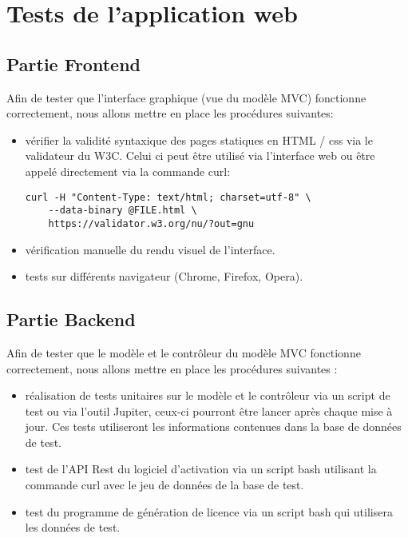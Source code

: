 \section{Tests de l'application web}

\subsection{Partie Frontend}

Afin de tester que l'interface graphique (vue du modèle MVC) fonctionne correctement, nous allons mettre en place les procédures suivantes:
\begin{itemize}

    \item vérifier la validité syntaxique des pages statiques en HTML / css via 
          le validateur du W3C. Celui ci peut être utilisé via l'interface web ou  
          être appelé directement via la commande curl:
          \begin{verbatim}
curl -H "Content-Type: text/html; charset=utf-8" \
    --data-binary @FILE.html \
    https://validator.w3.org/nu/?out=gnu
          \end{verbatim}
              
    \item vérification manuelle du rendu visuel de l'interface.
    \item tests sur différents navigateur (Chrome, Firefox, Opera).
            
\end{itemize}
\newpage

\subsection{Partie Backend}

Afin de tester que le modèle et le contrôleur du modèle MVC fonctionne correctement, 
nous allons mettre en place les procédures suivantes :
\begin{itemize}
    \item réalisation de tests unitaires sur le modèle et le contrôleur via 
          un script de test ou via l'outil Jupiter, ceux-ci pourront être lancer après 
          chaque mise à jour. Ces tests utiliseront les informations contenues dans la  
          base de données de test.
        
    \item test de l'API Rest du logiciel d'activation via un script bash 
          utilisant la commande curl avec le jeu de données de la base de test.
        
    \item test du programme de génération de licence via un script bash qui
          utilisera les données de test.
\end{itemize}

